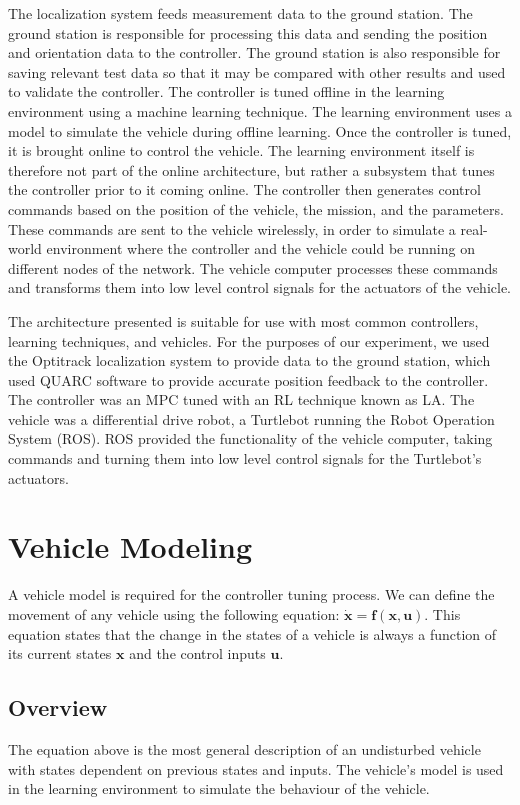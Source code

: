 \documentclass[conference]{IEEEtran}
\begin{document}
The localization system feeds measurement data to the ground station. The ground station is responsible for processing this data and sending the position and orientation data to the controller. The ground station is also responsible for saving relevant test data so that it may be compared with other results and used to validate the controller. The controller is tuned offline in the learning environment using a machine learning technique. The learning environment uses a model to simulate the vehicle during offline learning. Once the controller is tuned, it is brought online to control the vehicle. The learning environment itself is therefore not part of the online architecture, but rather a subsystem that tunes the controller prior to it coming online. The controller then generates control commands based on the position of the vehicle, the mission, and the parameters. These commands are sent to the vehicle wirelessly, in order to simulate a real-world environment where the controller and the vehicle could be running on different nodes of the network. The vehicle computer processes these commands and transforms them into low level control signals for the actuators of the vehicle.

The architecture presented is suitable for use with most common controllers, learning techniques, and vehicles. For the purposes of our experiment, we used the Optitrack localization system to provide data to the ground station, which used QUARC software to provide accurate position feedback to the controller. The controller was an MPC tuned with an RL technique known as LA. The vehicle was a differential drive robot, a Turtlebot running the Robot Operation System (ROS). ROS provided the functionality of the vehicle computer, taking commands and turning them into low level control signals for the Turtlebot's actuators.

\section{Vehicle Modeling} \label{sec:VehicleModel}

A vehicle model is required for the controller tuning process. We can define the movement of any vehicle using the following equation: $\mathbf{\dot{x}} = \mathbf{f(x, u)}$. This equation states that the change in the states of a vehicle is always a function of its current states $\mathbf{x}$ and the control inputs $\mathbf{u}$. 

\subsection{Overview}
The equation above is the most general description of an undisturbed vehicle with states dependent on previous states and inputs. The vehicle's model is used in the learning environment to simulate the behaviour of the vehicle. 
\end{document}
